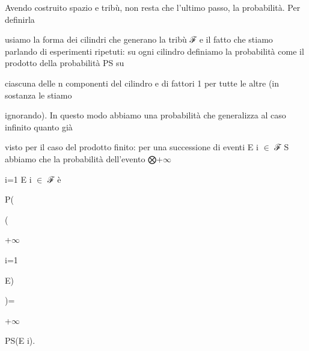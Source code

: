 \documentclass[a4paper,portrait,12pt]{article}
\begin{document}
\begin{flushleft}
Avendo costruito spazio e tribù, non resta che l'ultimo passo, la probabilit\`{a}. Per definirla
\end{flushleft}


\begin{flushleft}
usiamo la forma dei cilindri che generano la tribù ℱ e il fatto che stiamo parlando di esperimenti ripetuti: su ogni cilindro definiamo la probabilit\`{a} come il prodotto della probabilit\`{a} PS su
\end{flushleft}


\begin{flushleft}
ciascuna delle n componenti del cilindro e di fattori 1 per tutte le altre (in sostanza le stiamo
\end{flushleft}


\begin{flushleft}
ignorando). In questo modo abbiamo una probabilit\`{a} che generalizza al caso infinito quanto gi\`{a}
\end{flushleft}


\begin{flushleft}
visto per il caso del prodotto finito: per una successione di eventi E i $\in$ ℱ S abbiamo che la probabilit\`{a} dell'evento ⨂+$\infty$
\end{flushleft}


\begin{flushleft}
i=1 E i $\in$ ℱ \`{e}
\end{flushleft}


\begin{flushleft}
P(
\end{flushleft}


(





+$\infty$


\begin{flushleft}
i=1
\end{flushleft}





\begin{flushleft}
E)
\end{flushleft}


)=





+$\infty$





\begin{flushleft}
PS(E i).
\end{flushleft}
\end{document}
